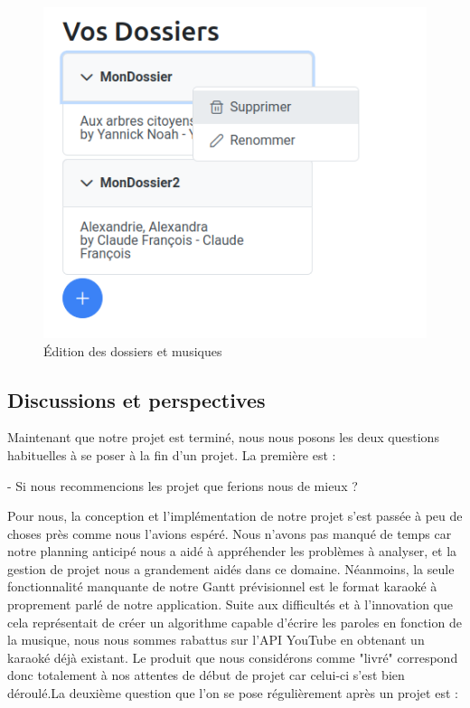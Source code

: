 \documentclass[12pt,french]{article}
\begin{document}
\begin{figure}[H]
\begin{minipage}{.3\textwidth}
	\includegraphics[scale=0.4]{dossier5.png}
\end{minipage}
	\caption{Édition des dossiers et musiques}    
	\label{figure19} 
\end{figure}

\newpage
\vspace*{5pt}

\subsection{Discussions et perspectives}

Maintenant que notre projet est terminé, nous nous posons les deux questions habituelles à se poser à la fin d'un projet. La première est : 
\newline

- Si nous recommencions les projet que ferions nous de mieux ?  
\newline


Pour nous, la conception et l'implémentation de notre projet s'est passée à peu de choses près comme nous l'avions espéré. Nous n'avons pas manqué de temps car notre planning anticipé nous a aidé à appréhender les problèmes à analyser, et la gestion de projet nous a grandement aidés dans ce domaine. Néanmoins, la seule fonctionnalité manquante de notre Gantt prévisionnel est le format karaoké à proprement parlé de notre application. Suite aux difficultés et à l'innovation que cela représentait de créer un algorithme capable d'écrire les paroles en fonction de la musique, nous nous sommes rabattus sur l'\gls{API} YouTube en obtenant un karaoké déjà existant. Le produit que nous considérons comme "livré" correspond donc totalement à nos attentes de début de projet car celui-ci s'est bien déroulé.La deuxième question que l'on se pose régulièrement après un projet est :
\newline
\end{document}

